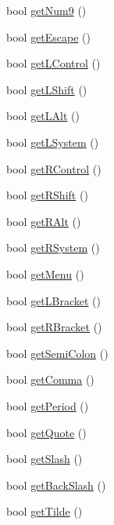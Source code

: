 \begin{DoxyCompactItemize}
\item 
bool \hyperlink{class_keyboard_a0e1c476a2d5e4c9c0f9a7a2c97356bfa}{get\-Num9} ()
\item 
bool \hyperlink{class_keyboard_a994ab28476380c8233e80cb0f349bdb8}{get\-Escape} ()
\item 
bool \hyperlink{class_keyboard_a5f60b99ed9f012e78629acfe1f795be3}{get\-L\-Control} ()
\item 
bool \hyperlink{class_keyboard_a410f25adf92d4120faeab8334ededba9}{get\-L\-Shift} ()
\item 
bool \hyperlink{class_keyboard_a2ad4b6abd18ebd2a6c69da2de338265c}{get\-L\-Alt} ()
\item 
bool \hyperlink{class_keyboard_ab58d4d9bb82bf64de46fa1792fd80086}{get\-L\-System} ()
\item 
bool \hyperlink{class_keyboard_a428d96963222eff1fefb15198403c14c}{get\-R\-Control} ()
\item 
bool \hyperlink{class_keyboard_a412703b9a1957036c6ef559e804aed91}{get\-R\-Shift} ()
\item 
bool \hyperlink{class_keyboard_a670aae3f40bf02f26fb966f25ff06234}{get\-R\-Alt} ()
\item 
bool \hyperlink{class_keyboard_a8659cc000033848acae7c18683886a92}{get\-R\-System} ()
\item 
bool \hyperlink{class_keyboard_ad5c31b46ab392c8cfeb4f060ce346e22}{get\-Menu} ()
\item 
bool \hyperlink{class_keyboard_a62d0bd6e13a7c2ef5d70f0c63c7b6104}{get\-L\-Bracket} ()
\item 
bool \hyperlink{class_keyboard_a065e43a5ece4a6a8790e3f8a8817ea23}{get\-R\-Bracket} ()
\item 
bool \hyperlink{class_keyboard_add5ee27f0c650e722f0c6666ed57b022}{get\-Semi\-Colon} ()
\item 
bool \hyperlink{class_keyboard_aec17bf7d0b87ccdd5020ab9fa3b94413}{get\-Comma} ()
\item 
bool \hyperlink{class_keyboard_a6fc2692d8e1006b086a82678aabdbad3}{get\-Period} ()
\item 
bool \hyperlink{class_keyboard_a09b58b89fb75696031d097278eac0ec7}{get\-Quote} ()
\item 
bool \hyperlink{class_keyboard_af84d491804fc8be29f3646251faf1611}{get\-Slash} ()
\item 
bool \hyperlink{class_keyboard_a57019e241d4e3413ee6bd68e6a6a3d79}{get\-Back\-Slash} ()
\item 
bool \hyperlink{class_keyboard_ab0e0b87609daf296416a181d2aa327cb}{get\-Tilde} ()

\end{DoxyCompactItemize}
